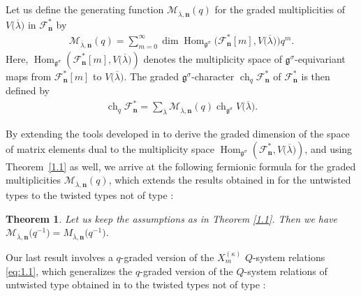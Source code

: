 \documentclass[pdftex]{sigma}
\numberwithin{equation}{section}
\newtheorem{Theorem}{Theorem}[section]
\DeclareMathOperator{\Hom}{Hom}
\DeclareMathOperator{\ch}{ch}
\begin{document}
Let us define the generating function $\mathcal{M}_{\overline{\lambda},\mathbf{n}}(q)$ for the graded multiplicities of $V\bigl(\overline{\lambda}\bigr)$ in $\mathcal{F}_{\mathbf{n}}^*$ by
\begin{gather}
\mathcal{M}_{\overline{\lambda},\mathbf{n}}(q)=\sum_{m=0}^{\infty}\dim\Hom_{\mathfrak{g}^{\sigma}}\bigl(\mathcal{F}_{\mathbf{n}}^*[m],V\bigl(\overline{\lambda}\bigr)\bigr)q^m.\label{eq:1.8}
\end{gather}
Here, $\Hom_{\mathfrak{g}^{\sigma}}(\mathcal{F}_{\mathbf{n}}^*[m],V\bigl(\overline{\lambda}\bigr))$ denotes the multiplicity space of $\mathfrak{g}^{\sigma}$-equivariant maps from $\mathcal{F}_{\mathbf{n}}^*[m]$ to $V\bigl(\overline{\lambda}\bigr)$. The graded $\mathfrak{g}^{\sigma}$-character $\ch_q \mathcal{F}_{\mathbf{n}}^*$ of $\mathcal{F}_{\mathbf{n}}^*$ is then defined by
\begin{gather*}
\ch_q \mathcal{F}_{\mathbf{n}}^*= \sum_{\overline{\lambda}}\mathcal{M}_{\overline{\lambda},\mathbf{n}}(q)\ch_{\mathfrak{g}^{\sigma}}V\bigl(\overline{\lambda}\bigr).
\end{gather*}

By extending the tools developed in \cite{AK07} to derive the graded dimension of the space of matrix elements dual to the multiplicity space $\Hom_{\mathfrak{g}^{\sigma}}(\mathcal{F}_{\mathbf{n}}^*,V\bigl(\overline{\lambda}\bigr))$, and using Theorem~\ref{1.1} as well, we arrive at the following fermionic formula for the graded multiplicities $\mathcal{M}_{\overline{\lambda},\mathbf{n}}(q)$, which extends the results obtained in \cite{AK07,DFK08} for the untwisted types to the twisted types not of type :

\begin{Theorem}\label{1.2}
Let us keep the assumptions as in Theorem {\rm\ref{1.1}}. Then we have
$
\mathcal{M}_{\overline{\lambda},\mathbf{n}}\bigl(q^{-1}\bigr)=M_{\overline{\lambda},\mathbf{n}}\bigl(q^{-1}\bigr)$.
\end{Theorem}

Our last result involves a $q$-graded version of the $X_m^{(\kappa)}$ $Q$-system relations \eqref{eq:1.1}, which generalizes the $q$-graded version of the $Q$-system relations of untwisted type obtained in \cite[Theorem~1.3]{Lin21} to the twisted types not of type :
\end{document}
